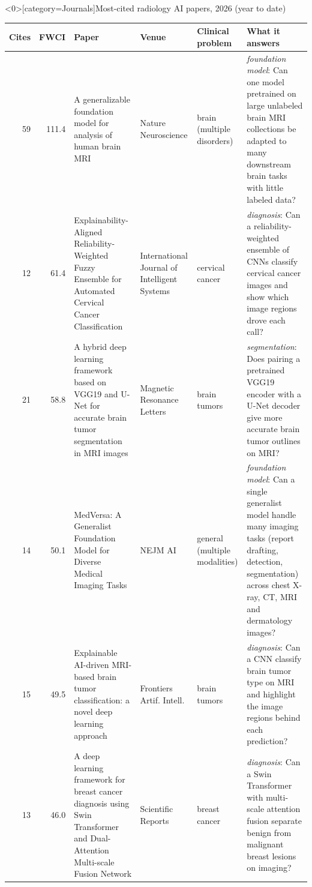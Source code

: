 \documentclass[aspectratio=169]{beamer}
\renewcommand{\arraystretch}{1.08}
\begin{document}
\begin{frame}<0>[category=Journals]{Most-cited radiology AI papers, 2026 (year to date)}
\tiny
\begin{adjustbox}{max totalsize={\textwidth}{0.74\textheight}}
\renewcommand{\arraystretch}{1.2}
\begin{tabular}{|r|r|>{\raggedright\arraybackslash}p{}|>{\raggedright\arraybackslash}p{}|>{\raggedright\arraybackslash}p{}|>{\raggedright\arraybackslash}p{}|}
\hline \textbf{Cites} & \textbf{FWCI} & \textbf{Paper} & \textbf{Venue} & \textbf{Clinical problem} & \textbf{What it answers} \\ \hline
59 & 111.4 & A generalizable foundation model for analysis of human brain MRI & Nature Neuroscience & brain (multiple disorders) & \textit{foundation model}: Can one model pretrained on large unlabeled brain MRI collections be adapted to many downstream brain tasks with little labeled data? \\ \hline
12 & 61.4 & Explainability-Aligned Reliability-Weighted Fuzzy Ensemble for Automated Cervical Cancer Classification & International Journal of Intelligent Systems & cervical cancer & \textit{diagnosis}: Can a reliability-weighted ensemble of CNNs classify cervical cancer images and show which image regions drove each call? \\ \hline
21 & 58.8 & A hybrid deep learning framework based on VGG19 and U-Net for accurate brain tumor segmentation in MRI images & Magnetic Resonance Letters & brain tumors & \textit{segmentation}: Does pairing a pretrained VGG19 encoder with a U-Net decoder give more accurate brain tumor outlines on MRI? \\ \hline
14 & 50.1 & MedVersa: A Generalist Foundation Model for Diverse Medical Imaging Tasks & NEJM AI & general (multiple modalities) & \textit{foundation model}: Can a single generalist model handle many imaging tasks (report drafting, detection, segmentation) across chest X-ray, CT, MRI and dermatology images? \\ \hline
15 & 49.5 & Explainable AI-driven MRI-based brain tumor classification: a novel deep learning approach & Frontiers Artif. Intell. & brain tumors & \textit{diagnosis}: Can a CNN classify brain tumor type on MRI and highlight the image regions behind each prediction? \\ \hline
13 & 46.0 & A deep learning framework for breast cancer diagnosis using Swin Transformer and Dual-Attention Multi-scale Fusion Network & Scientific Reports & breast cancer & \textit{diagnosis}: Can a Swin Transformer with multi-scale attention fusion separate benign from malignant breast lesions on imaging? \\ \hline

\end{tabular}
\end{adjustbox}
\end{frame}
\end{document}
